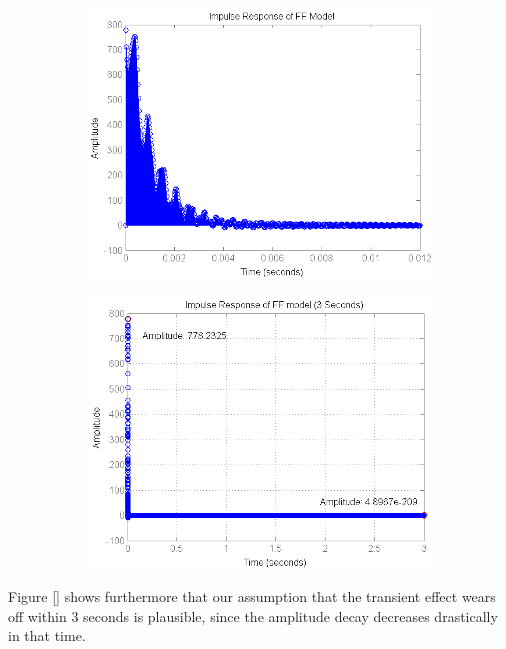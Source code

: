 \begin{figure}[h]
\centering
\begin{subfigure}[b]{0.5\textwidth}
\includegraphics[width=1.0\textwidth]{pics/impulse_FF}
\caption{}
\label{pic:}
\end{subfigure}\;\begin{subfigure}[b]{0.5\textwidth}
\includegraphics[width=1.0\textwidth]{pics/impulse_FF_3sec}
\caption{}
\label{pic:}
\end{subfigure}

\end{figure}

Figure \ref{} shows furthermore that our assumption that the transient effect wears off within 3 seconds is plausible, since the amplitude decay decreases drastically in that time.

